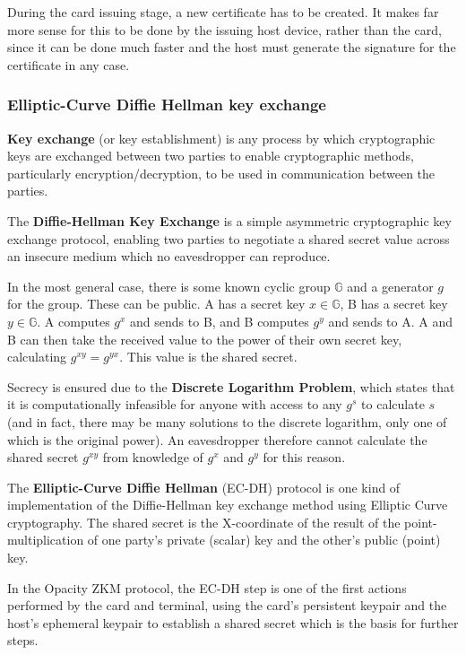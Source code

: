 \documentclass[12pt,a4paper]{article}
\begin{document}
During the card issuing stage, a new certificate has to be created. It makes far more sense for this to be done by the issuing host device, rather than the card, since it can be done much faster and the host must generate the signature for the certificate in any case.



\subsubsection{Elliptic-Curve Diffie Hellman key exchange}
\label{subsec:diffie_hellman}

\textbf{Key exchange }(or key establishment) is any process by which cryptographic keys are exchanged between two parties to enable cryptographic methods, particularly encryption/decryption, to be used in communication between the parties.

The \textbf{Diffie-Hellman Key Exchange} is a simple asymmetric cryptographic key exchange protocol, enabling two parties to negotiate a shared secret value across an insecure medium which no eavesdropper can reproduce.

In the most general case, there is some known cyclic group $\mathbb{G}$ and a generator $g$ for the group. These can be public. A has a secret key $x \in \mathbb{G}$, B has a secret key $y \in \mathbb{G}$. A computes $g^x$ and sends to B, and B computes $g^y$ and sends to A. A and B can then take the received value to the power of their own secret key, calculating $g^{xy}=g^{yx}$. This value is the shared secret.

Secrecy is ensured due to the \textbf{Discrete Logarithm Problem}, which states that it is computationally infeasible for anyone with access to any $g^s$ to calculate $s$ (and in fact, there may be many solutions to the discrete logarithm, only one of which is the original power). An eavesdropper therefore cannot calculate the shared secret $g^{xy}$ from knowledge of $g^x$ and $g^y$ for this reason.

The \textbf{Elliptic-Curve Diffie Hellman} (EC-DH) protocol is one kind of implementation of the Diffie-Hellman key exchange method using Elliptic Curve cryptography. The shared secret is the X-coordinate of the result of the point-multiplication of one party's private (scalar) key and the other's public (point) key.

In the Opacity ZKM protocol, the EC-DH step is one of the first actions performed by the card and terminal, using the card's persistent keypair and the host's ephemeral keypair to establish a shared secret which is the basis for further steps. 
\end{document}
